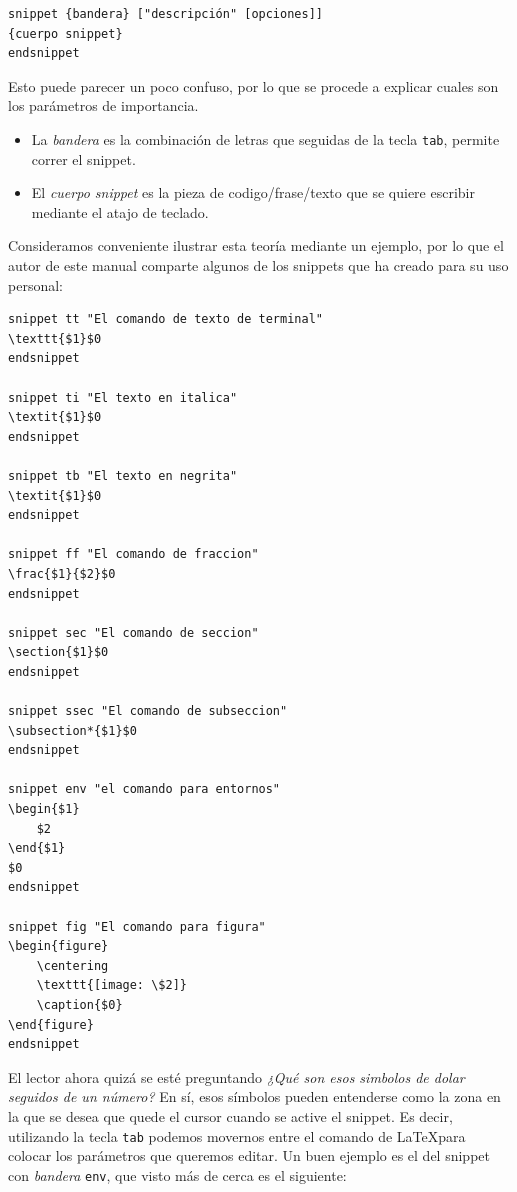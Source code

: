 \documentclass[10pt]{article}
\begin{document}
\begin{verbatim}
snippet {bandera} ["descripción" [opciones]]
{cuerpo snippet}
endsnippet
\end{verbatim}
Esto puede parecer un poco confuso, por lo que se procede a explicar cuales son los parámetros de importancia.
\begin{itemize}
	\item La \textit{bandera} es la combinación de letras que seguidas de la tecla \texttt{tab}, permite correr el snippet. 
	\item El \textit{cuerpo snippet} es la pieza de codigo\slash frase\slash texto que se quiere escribir mediante el atajo de teclado. 
\end{itemize}
Consideramos conveniente ilustrar esta teoría mediante un ejemplo, por lo que el autor de este manual comparte algunos de los snippets que ha creado para su uso personal:
\begin{verbatim}
snippet tt "El comando de texto de terminal"
\texttt{$1}$0
endsnippet

snippet ti "El texto en italica"
\textit{$1}$0
endsnippet

snippet tb "El texto en negrita"
\textit{$1}$0
endsnippet

snippet ff "El comando de fraccion"
\frac{$1}{$2}$0
endsnippet

snippet sec "El comando de seccion"
\section{$1}$0
endsnippet

snippet ssec "El comando de subseccion"
\subsection*{$1}$0
endsnippet

snippet env "el comando para entornos"
\begin{$1}
	$2
\end{$1}
$0
endsnippet

snippet fig "El comando para figura"
\begin{figure}
	\centering
	\texttt{[image: \$2]}
	\caption{$0}
\end{figure}
endsnippet
\end{verbatim}
El lector ahora quizá se esté preguntando \textit{¿Qué son esos simbolos de dolar seguidos de un número?} En sí, esos símbolos pueden entenderse como la zona en la que se desea que quede el cursor cuando se active el snippet. Es decir, utilizando la tecla \texttt{tab} podemos movernos entre el comando de \LaTeX para colocar los parámetros que queremos editar. Un buen ejemplo es el del snippet con \textit{bandera} \texttt{env}, que visto más de cerca es el siguiente:
\end{document}
